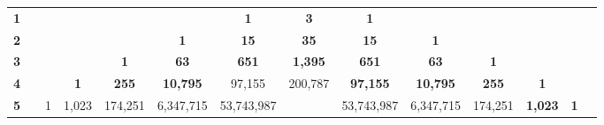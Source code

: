 \documentclass[11pt,dvipsnames]{article} %
\newcommand{\1}{\mathds{1}}
\begin{document}
\begin{table}[h!]
\tiny
\begin{tabular}{llllccccccclll}
{\color[HTML]{FF0000} \textbf{1}} &                       &                           &                                & \multicolumn{1}{l}{} & \multicolumn{1}{l}{}               & \cellcolor[HTML]{FCE5CD}\textbf{1}   & \textbf{3}                             & \textbf{1}                              & \multicolumn{1}{l}{}                    & \multicolumn{1}{l}{}                &                                                       &                                    &                                \\
{\color[HTML]{FF0000} \textbf{2}} &                       &                           &                                & \multicolumn{1}{l}{} & \cellcolor[HTML]{FCE5CD}\textbf{1} & \cellcolor[HTML]{CFE2F3}\textbf{15}  & \cellcolor[HTML]{FCE5CD}\textbf{35}    & \textbf{15}                             & \textbf{1}                              & \multicolumn{1}{l}{}                &                                                       &                                    &                                \\
{\color[HTML]{FF0000} \textbf{3}} &                       &                           &                                & \textbf{1}           & \textbf{63}                        & \cellcolor[HTML]{FCE5CD}\textbf{651} & \cellcolor[HTML]{CFE2F3}\textbf{1,395} & \cellcolor[HTML]{FCE5CD}\textbf{651}    & \textbf{63}                             & \textbf{1}                          &                                                       &                                    &                                \\
{\color[HTML]{FF0000} \textbf{4}} &                       &                           & \multicolumn{1}{c}{\textbf{1}} & \textbf{255}         & \textbf{10,795}                    & 97,155                               & \cellcolor[HTML]{FCE5CD}200,787        & \cellcolor[HTML]{CFE2F3}\textbf{97,155} & \cellcolor[HTML]{FCE5CD}\textbf{10,795} & \textbf{255}                        & \multicolumn{1}{c}{\textbf{1}}                        &                                    &                                \\
{\color[HTML]{FF0000} \textbf{5}} &                       & \multicolumn{1}{c}{1}     & \multicolumn{1}{c}{1,023}      & 174,251              & 6,347,715                          & 53,743,987                           & \multicolumn{1}{l}{}                   & \cellcolor[HTML]{FCE5CD}53,743,987      & \cellcolor[HTML]{CFE2F3}6,347,715       & \cellcolor[HTML]{FCE5CD}174,251     & \multicolumn{1}{c}{\textbf{1,023}}                    & \multicolumn{1}{c}{\textbf{1}}     &                                \\

\end{tabular}
\end{table}
\end{document}
